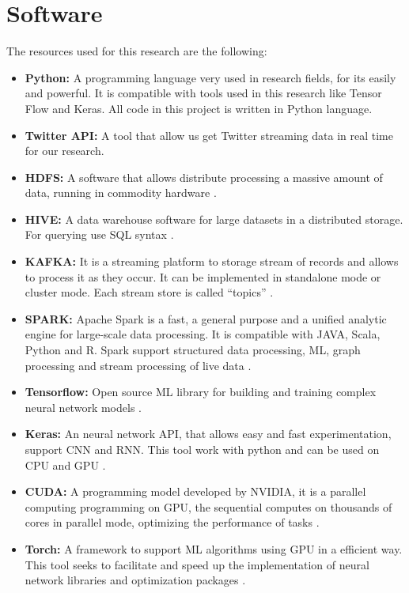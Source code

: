 \documentclass[12pt]{report}
\begin{document}
\section{Software}
The resources used for this research are the following: 
\begin{itemize}[nolistsep]
	\item \textbf{Python:} A programming language very used in research fields, for its easily and powerful. It is compatible with tools used in this research like Tensor Flow and Keras. All code in this project is written in Python language.
	
	\item \textbf{Twitter \ac{API}:} A tool that allow us get Twitter streaming data in real time for our research. 
	
	\item \textbf{\ac{HDFS}:} A software that allows  distribute processing a  massive amount of data, running in commodity hardware \cite{Hadoop2019}.
	
	\item \textbf{HIVE:} A data warehouse software for large datasets in a distributed storage. For querying use \ac{SQL} syntax \cite{Hive2019}.
	
	\item \textbf{KAFKA:} It is a streaming platform to storage stream of records and allows to process it as they occur. It can be implemented in standalone mode or cluster mode. Each stream store is called ``topics'' \cite{Kafka2019}.
	
	\item \textbf{SPARK:} Apache Spark is a fast, a general purpose and a unified analytic engine for large-scale data processing. It is compatible with JAVA, Scala, Python and R. Spark support structured data processing, \ac{ML}, graph processing and stream processing of live data \cite{Spark2019}.
	
	\item \textbf{Tensorflow:} Open source \ac{ML} library for building and training complex neural network models \cite{Tensor2019}.
	
	\item \textbf{Keras:} An neural network \ac{API}, that allows easy and fast experimentation, support \ac{CNN} and \ac{RNN}. This tool work with python and can be used on \ac{CPU} and \ac{GPU} \cite{Keras2019}.
	
	\item \textbf{\ac{CUDA}:} A programming model developed by NVIDIA, it is a parallel computing programming on \ac{GPU}, the sequential computes on thousands of cores in parallel mode, optimizing the performance of tasks \cite{Cuda2019}.
	
	\item \textbf{Torch: } A framework to support \ac{ML} algorithms using \ac{GPU} in a efficient way. This tool seeks to facilitate and speed up the implementation of neural network libraries and optimization packages \cite{Torch2019}.\\
	
\end{itemize}
\end{document}
